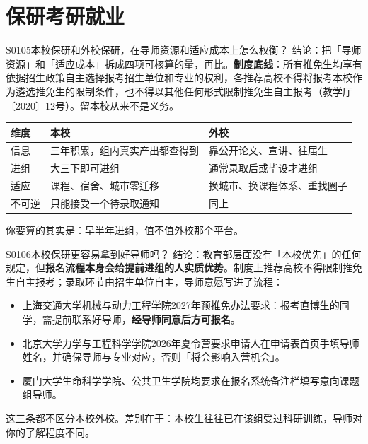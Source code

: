 \section{保研考研就业}
\begin{qa}{S0105}{本校保研和外校保研，在导师资源和适应成本上怎么权衡？}
结论：把「导师资源」和「适应成本」拆成四项可核算的量，再比。\textbf{制度底线}：所有推免生均享有依据招生政策自主选择报考招生单位和专业的权利，各推荐高校不得将报考本校作为遴选推免生的限制条件，也不得以其他任何形式限制推免生自主报考（教学厅〔2020〕12号）。留本校从来不是义务。

\par\vspace{2pt}\nobreak\begin{center}\footnotesize
\begin{tabularx}{\textwidth}{>{\raggedright\arraybackslash}X>{\raggedright\arraybackslash}X>{\raggedright\arraybackslash}X}
\toprule
\textbf{维度} & \textbf{本校} & \textbf{外校} \\ \midrule
信息 & 三年积累，组内真实产出都查得到 & 靠公开论文、宣讲、往届生 \\
进组 & 大三下即可进组 & 通常录取后或毕设才进组 \\
适应 & 课程、宿舍、城市零迁移 & 换城市、换课程体系、重找圈子 \\
不可逆 & 只能接受一个待录取通知 & 同上 \\
\bottomrule
\end{tabularx}
\end{center}\vspace{2pt}\par

你要算的其实是：早半年进组，值不值外校那个平台。
\end{qa}

\begin{qa}{S0106}{本校保研更容易拿到好导师吗？}
结论：教育部层面没有「本校优先」的任何规定，但\textbf{报名流程本身会给提前进组的人实质优势}。制度上推荐高校不得限制推免生自主报考；录取环节由招生单位自主，导师意愿写进了流程：

\begin{itemize}
  \item 上海交通大学机械与动力工程学院2027年预推免办法要求：报考直博生的同学，需提前联系好导师，\textbf{经导师同意后方可报名}。
  \item 北京大学力学与工程科学学院2026年夏令营要求申请人在申请表首页手填导师姓名，并确保导师与专业对应，否则「将会影响入营机会」。
  \item 厦门大学生命科学学院、公共卫生学院均要求在报名系统备注栏填写意向课题组导师。
\end{itemize}

这三条都不区分本校外校。差别在于：本校生往往已在该组受过科研训练，导师对你的了解程度不同。
\end{qa}

